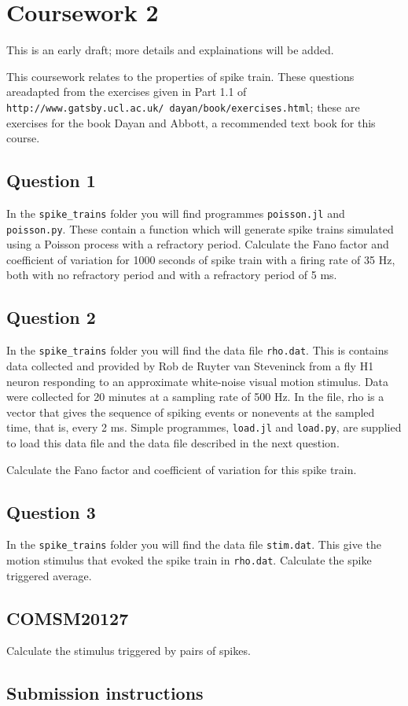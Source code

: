 \documentclass[12pt]{article}
\begin{document}
\section*{Coursework 2}

This is an early draft; more details and explainations will be added.

This coursework relates to the properties of spike train. These
questions areadapted from the exercises given in Part 1.1 of
\texttt{http://www.gatsby.ucl.ac.uk/~dayan/book/exercises.html}; these
are exercises for the book Dayan and Abbott, a recommended text book
for this course.


\subsection*{Question 1}

In the \texttt{spike\_trains} folder you will find programmes
\texttt{poisson.jl} and \texttt{poisson.py}. These contain a function
which will generate spike trains simulated using a Poisson process
with a refractory period. Calculate the Fano factor and coefficient of
variation for 1000 seconds of spike train with a firing rate of 35 Hz,
both with no refractory period and with a refractory period of 5 ms.

\subsection*{Question 2}

In the \texttt{spike\_trains} folder you will find the data file
\texttt{rho.dat}. This is contains data collected and provided by Rob
de Ruyter van Steveninck from a fly H1 neuron responding to an
approximate white-noise visual motion stimulus. Data were collected
for 20 minutes at a sampling rate of 500 Hz. In the file, rho is a
vector that gives the sequence of spiking events or nonevents at the
sampled time, that is, every 2 ms. Simple programmes, \texttt{load.jl}
and \texttt{load.py}, are supplied to load this data file and the data
file described in the next question.

Calculate the Fano factor and coefficient of variation for this spike train.

\subsection*{Question 3} 

In the \texttt{spike\_trains} folder you will find the data file
\texttt{stim.dat}. This give the motion stimulus that evoked the spike
train in \texttt{rho.dat}. Calculate the spike triggered average.

\subsection*{COMSM20127}

Calculate the stimulus triggered by pairs of spikes.

\subsection*{Submission instructions}
\end{document}
